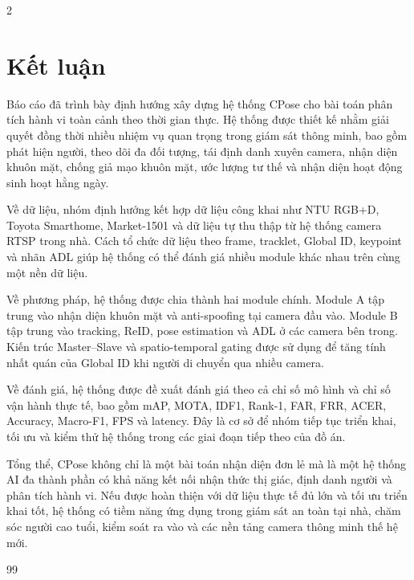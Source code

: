 \documentclass[a4paper, twoside, 12pt]{article}
\begin{document}
\begin{multicols}{2}
\vspace{0.2cm}

\section{Kết luận}
\vspace{-0.6cm}

Báo cáo đã trình bày định hướng xây dựng hệ thống CPose cho bài toán phân tích hành vi toàn cảnh theo thời gian thực. Hệ thống được thiết kế nhằm giải quyết đồng thời nhiều nhiệm vụ quan trọng trong giám sát thông minh, bao gồm phát hiện người, theo dõi đa đối tượng, tái định danh xuyên camera, nhận diện khuôn mặt, chống giả mạo khuôn mặt, ước lượng tư thế và nhận diện hoạt động sinh hoạt hằng ngày.

Về dữ liệu, nhóm định hướng kết hợp dữ liệu công khai như NTU RGB+D, Toyota Smarthome, Market-1501 và dữ liệu tự thu thập từ hệ thống camera RTSP trong nhà. Cách tổ chức dữ liệu theo frame, tracklet, Global ID, keypoint và nhãn ADL giúp hệ thống có thể đánh giá nhiều module khác nhau trên cùng một nền dữ liệu.

Về phương pháp, hệ thống được chia thành hai module chính. Module A tập trung vào nhận diện khuôn mặt và anti-spoofing tại camera đầu vào. Module B tập trung vào tracking, ReID, pose estimation và ADL ở các camera bên trong. Kiến trúc Master--Slave và spatio-temporal gating được sử dụng để tăng tính nhất quán của Global ID khi người di chuyển qua nhiều camera.

Về đánh giá, hệ thống được đề xuất đánh giá theo cả chỉ số mô hình và chỉ số vận hành thực tế, bao gồm mAP, MOTA, IDF1, Rank-1, FAR, FRR, ACER, Accuracy, Macro-F1, FPS và latency. Đây là cơ sở để nhóm tiếp tục triển khai, tối ưu và kiểm thử hệ thống trong các giai đoạn tiếp theo của đồ án.

Tổng thể, CPose không chỉ là một bài toán nhận diện đơn lẻ mà là một hệ thống AI đa thành phần có khả năng kết nối nhận thức thị giác, định danh người và phân tích hành vi. Nếu được hoàn thiện với dữ liệu thực tế đủ lớn và tối ưu triển khai tốt, hệ thống có tiềm năng ứng dụng trong giám sát an toàn tại nhà, chăm sóc người cao tuổi, kiểm soát ra vào và các nền tảng camera thông minh thế hệ mới.

\vspace{0.2cm}

\clearpage
{}
\begin{thebibliography}{99}
\fontsize{10}{12}\selectfont


\end{thebibliography}
\end{multicols}
\end{document}
